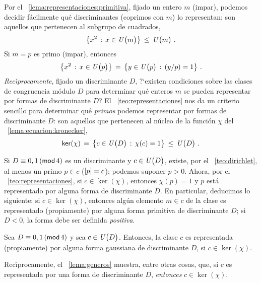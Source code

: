 Por el \lemaname~\ref{lema:representaciones:primitiva}, fijado un entero
$m$ (impar), podemos decidir f\'acilmente qu\'e discriminantes (coprimos
con $m$) lo representan:
son aquellos que pertenecen al subgrupo de cuadrados,
\begin{displaymath}
	\big\{ x^2\,:\,x\in\Unidadesmod[m] \big\}\,\leq\,\Unidadesmod[m]
	\dispstop
\end{displaymath}
%
Si $m=p$ es primo (impar), entonces
\begin{displaymath}
	\big\{ x^2\,:\,x\in\Unidadesmod[p] \big\}\,=\,
		\big\{ y\in\Unidadesmod[p]\,:\,\tlegendre y p=1\big\}
	\dispstop
\end{displaymath}
%
\emph{Rec\'{\i}procamente}, fijado un discriminante $D$,
?`existen condiciones sobre las clases de congruencia m\'odulo $D$
para determinar qu\'e enteros $m$ se pueden representar por formas de
discriminante $D$?
El \teoname~\ref{teo:representaciones} nos da un criterio sencillo
para determinar qu\'e \emph{primos} podemos representar por formas
de discriminante $D$:
son aquellos que pertenecen al n\'ucleo de la funci\'on $\chi$ del
\lemaname~\ref{lema:ecuacion:kronecker},
\begin{displaymath}
	\ker(\chi)\,=\,\big\{c\in\Unidadesmod[D]\,:\,\chi(c)=1\big\}
		\,\leq\,\Unidadesmod[D]
	\dispstop
\end{displaymath}
%

Si $D\equiv 0,1\tmodulo[4]$ es un discriminante y
$c\in\Unidadesmod[D]$, existe, por el \teoname~\ref{teo:dirichlet},
al menos un primo $p\in c$ ($\clase p=c$); podemos suponer $p>0$.
Ahora, por el \teoname~\ref{teo:representaciones}, si $c\in\ker(\chi)$,
entonces $\chi(p)=1$ y $p$ est\'a representado por alguna forma
de discriminante $D$.
En particular, deducimos lo siguiente:
si $c\in\ker(\chi)$, entonces alg\'un elemento $m\in c$ de la clase
es representado (propiamente) por alguna forma primitiva de
discriminante $D$; si $D<0$, la forma debe ser definida \emph{positiva}.

\begin{coroDirichlet}\label{coro:dirichlet}
	Sea $D\equiv 0,1\tmodulo[4]$ y sea $c\in\Unidadesmod[D]$.
	Entonces, la clase $c$ es representada (propiamente) por
	alguna forma gaussiana de discriminante $D$, si $c\in\ker(\chi)$.
\end{coroDirichlet}

\begin{obsDirichlet}\label{obs:dirichlet:generos}
	Rec\'{\i}procamente, el \lemaname~\ref{lema:generos} muestra,
	entre otras cosas, que, si $c$ es representada por una forma
	de discriminante $D$, \emph{entonces} $c\in\ker(\chi)$.
\end{obsDirichlet}

